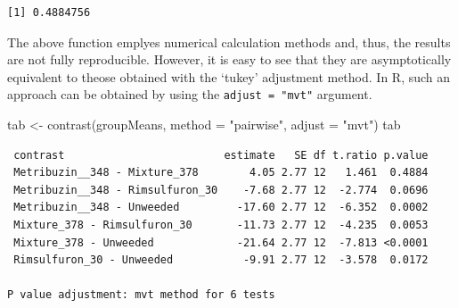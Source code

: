\documentclass[
  letterpaper,
  DIV=11,
  numbers=noendperiod]{scrreprt}
\newenvironment{Shaded}{\begin{snugshade}}{\end{snugshade}}
\newcommand{\AttributeTok}[1]{\textcolor[rgb]{0.40,0.45,0.13}{#1}}
\newcommand{\DecValTok}[1]{\textcolor[rgb]{0.68,0.00,0.00}{#1}}
\newcommand{\FunctionTok}[1]{\textcolor[rgb]{0.28,0.35,0.67}{#1}}
\newcommand{\NormalTok}[1]{\textcolor[rgb]{0.00,0.23,0.31}{#1}}
\newcommand{\OtherTok}[1]{\textcolor[rgb]{0.00,0.23,0.31}{#1}}
\newcommand{\SpecialCharTok}[1]{\textcolor[rgb]{0.37,0.37,0.37}{#1}}
\newcommand{\StringTok}[1]{\textcolor[rgb]{0.13,0.47,0.30}{#1}}
\begin{document}
\begin{Shaded}
\end{Shaded}

\begin{verbatim}
[1] 0.4884756
\end{verbatim}

The above function emplyes numerical calculation methods and, thus, the
results are not fully reproducible. However, it is easy to see that they
are asymptotically equivalent to theose obtained with the `tukey'
adjustment method. In R, such an approach can be obtained by using the
\texttt{adjust\ =\ "mvt"} argument.

\begin{Shaded}
\begin{Highlighting}[]
\NormalTok{tab }\OtherTok{\textless{}{-}} \FunctionTok{contrast}\NormalTok{(groupMeans, }\AttributeTok{method =} \StringTok{"pairwise"}\NormalTok{, }\AttributeTok{adjust =} \StringTok{"mvt"}\NormalTok{)}
\NormalTok{tab}
\end{Highlighting}
\end{Shaded}

\begin{verbatim}
 contrast                         estimate   SE df t.ratio p.value
 Metribuzin__348 - Mixture_378        4.05 2.77 12   1.461  0.4884
 Metribuzin__348 - Rimsulfuron_30    -7.68 2.77 12  -2.774  0.0696
 Metribuzin__348 - Unweeded         -17.60 2.77 12  -6.352  0.0002
 Mixture_378 - Rimsulfuron_30       -11.73 2.77 12  -4.235  0.0053
 Mixture_378 - Unweeded             -21.64 2.77 12  -7.813 <0.0001
 Rimsulfuron_30 - Unweeded           -9.91 2.77 12  -3.578  0.0172

P value adjustment: mvt method for 6 tests 
\end{verbatim}
\end{document}
